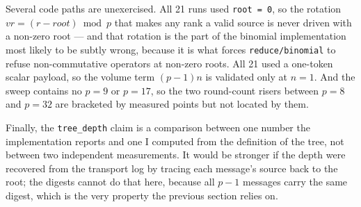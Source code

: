 \documentclass[11pt]{article}
\begin{document}
Several code paths are unexercised. All 21 runs used \texttt{root = 0}, so the rotation
$vr = (r-\mathit{root}) \bmod p$ that makes any rank a valid source is never driven with a
non-zero root --- and that rotation is the part of the binomial implementation most likely to
be subtly wrong, because it is what forces \texttt{reduce/binomial} to refuse non-commutative
operators at non-zero roots. All 21 used a one-token scalar payload, so the volume term
$(p-1)n$ is validated only at $n=1$. And the sweep contains no $p=9$ or $p=17$, so the two
round-count risers between $p=8$ and $p=32$ are bracketed by measured points but not located
by them.

Finally, the \texttt{tree\_depth} claim is a comparison between one number the implementation
reports and one I computed from the definition of the tree, not between two independent
measurements. It would be stronger if the depth were recovered from the transport log by
tracing each message's source back to the root; the digests cannot do that here, because all
$p-1$ messages carry the same digest, which is the very property the previous section relies
on.
\end{document}
